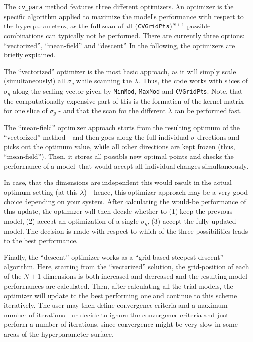 \documentclass[12pt]{achemso}
\begin{document}
\noindent The \texttt{cv\_para} method features three different optimizers. An optimizer is the specific algorithm applied to maximize the model's performance with respect to the hyperparameters, as the full scan of all (\texttt{CVGridPts})$^{N+1}$ possible combinations  can typically not be performed. There are currently three options: ``vectorized'', ``mean-field'' and ``descent''. In the following, the optimizers are briefly explained.

\noindent The ``vectorized'' optimizer is the most basic approach, as it will simply scale (simultaneously!) all $\sigma_g$ while scanning the $\lambda$. Thus, the code works with slices of $\sigma_g$ along the scaling vector given by \texttt{MinMod}, \texttt{MaxMod} and \texttt{CVGridPts}. Note, that the computationally expensive part of this is the formation of the kernel matrix for one slice of $\sigma_g$ - and that the scan for the different $\lambda$ can be performed fast.

\noindent The ``mean-field'' optimizer approach starts from the resulting optimum of the ``vectorized'' method - and then goes along the full individual $\sigma$ directions and picks out the optimum value, while all other directions are kept frozen (thus, ``mean-field''). Then, it stores all possible new optimal points and checks the performance of a model, that would accept all individual changes simultaneously.

\noindent In case, that the dimensions are independent this would result in the actual optimum setting (at this $\lambda$) - hence, this optimizer approach may be a very good choice depending on your system. After calculating the would-be performance of this update, the optimizer will then decide whether to (1) keep the previous model, (2) accept an optimization of a single $\sigma_g$, (3) accept the fully updated model. The decision is made with respect to which of the three possibilities leads to the best performance.

\noindent Finally, the ``descent'' optimizer works as a ``grid-based steepest descent'' algorithm. Here, starting from the ``vectorized'' solution, the grid-position of each of the $N+1$ dimensions is both increased and decreased and the resulting model performances are calculated. Then, after calculating all the trial models, the optimizer will update to the best performing one and continue to this scheme iteratively. The user may then define convergence criteria and a maximum number of iterations - or decide to ignore the convergence criteria and just perform a number of iterations, since convergence might be very slow in some areas of the hyperparameter surface.
\end{document}
